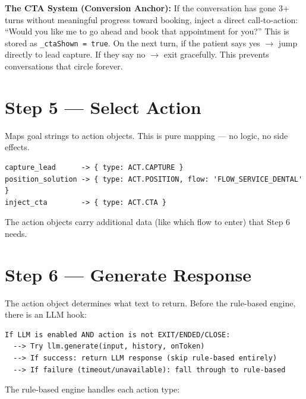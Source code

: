\documentclass[12pt, a4paper]{report}
\newcommand{\ic}[1]{\texttt{\small\color{accentblue!70!black}#1}}
\begin{document}
\begin{infobox}
  \textbf{The CTA System (Conversion Anchor):} If the conversation has gone 3+ turns
  without meaningful progress toward booking, inject a direct call-to-action: ``Would
  you like me to go ahead and book that appointment for you?'' This is stored as
  \ic{\_ctaShown = true}. On the next turn, if the patient says yes $\to$ jump directly
  to lead capture. If they say no $\to$ exit gracefully. This prevents conversations
  that circle forever.
\end{infobox}

\section{Step 5 --- Select Action}

Maps goal strings to action objects. This is pure mapping --- no logic, no side effects.

\begin{lstlisting}
capture_lead      -> { type: ACT.CAPTURE }
position_solution -> { type: ACT.POSITION, flow: 'FLOW_SERVICE_DENTAL' }
inject_cta        -> { type: ACT.CTA }
\end{lstlisting}

The action objects carry additional data (like which flow to enter) that Step 6 needs.

\section{Step 6 --- Generate Response}

The action object determines what text to return. Before the rule-based engine, there is
an LLM hook:

\begin{lstlisting}
If LLM is enabled AND action is not EXIT/ENDED/CLOSE:
  --> Try llm.generate(input, history, onToken)
  --> If success: return LLM response (skip rule-based entirely)
  --> If failure (timeout/unavailable): fall through to rule-based
\end{lstlisting}

The rule-based engine handles each action type:
\end{document}
